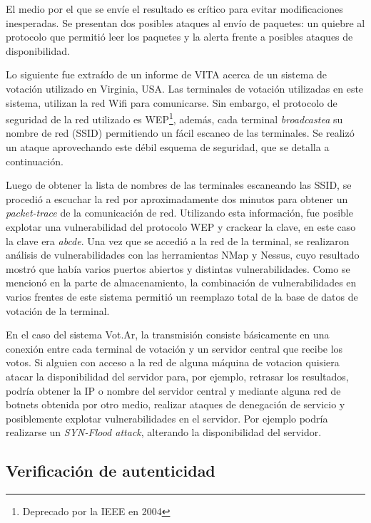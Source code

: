 El medio por el que se envíe el resultado es crítico para evitar modificaciones inesperadas. Se presentan dos posibles ataques al envío de paquetes: un quiebre al protocolo que permitió leer los paquetes y la alerta frente a posibles ataques de disponibilidad.

Lo siguiente fue extraído de un informe de VITA acerca de un sistema de votación utilizado en Virginia, USA\cite{vita}.
Las terminales de votación utilizadas en este sistema, utilizan la red Wifi para comunicarse. Sin embargo, el protocolo de seguridad de la red utilizado es WEP\footnote{Deprecado por la IEEE en 2004}, además, cada terminal \textit{broadcastea} su nombre de red (SSID) permitiendo un fácil escaneo de las terminales. Se realizó un ataque aprovechando este débil esquema de seguridad, que se detalla a continuación.

Luego de obtener la lista de nombres de las terminales escaneando las SSID, se procedió a escuchar la red por aproximadamente dos minutos para obtener un \textit{packet-trace} de la comunicación de red. Utilizando esta información, fue posible explotar una vulnerabilidad del protocolo WEP y crackear la clave, en este caso la clave era \textit{abcde}. Una vez que se accedió a la red de la terminal, se realizaron análisis de vulnerabilidades con las herramientas NMap\cite{nmap} y Nessus\cite{nessus}, cuyo resultado mostró que había varios puertos abiertos y distintas vulnerabilidades. Como se mencionó en la parte de almacenamiento, la combinación de vulnerabilidades en varios frentes de este sistema permitió un reemplazo total de la base de datos de votación de la terminal.


En el caso del sistema Vot.Ar, la transmisión consiste básicamente en una conexión entre cada terminal de votación y un servidor central que recibe los votos. Si alguien con acceso a la red de alguna máquina de votacion quisiera atacar la disponibilidad del servidor para, por ejemplo, retrasar los resultados, podría obtener la IP o nombre del servidor central y mediante alguna red de botnets obtenida por otro medio, realizar ataques de denegación de servicio y posiblemente explotar vulnerabilidades en el servidor. Por ejemplo podría realizarse un \textit{SYN-Flood attack}, alterando la disponibilidad del servidor.

\subsection{Verificación de autenticidad}

